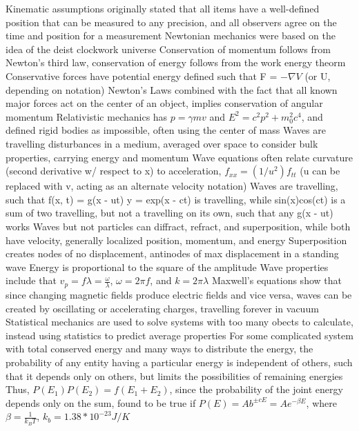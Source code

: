 \documentclass[11 pt, twoside]{article}
\newenvironment{outline*}
{
	\begin{outline}[enumerate]
	}
	{\end{outline}
}
\begin{document}
\begin{outline*}
\1 Kinematic assumptions originally stated that all items have a well-defined position that can be measured to any precision, and all observers agree on the time and position for a measurement
\1 Newtonian mechanics were based on the idea of the deist clockwork universe
	\2 Conservation of momentum follows from Newton's third law, conservation of energy follows from the work energy theorm
	\2 Conservative forces have potential energy defined such that F = $-\nabla V$ (or U, depending on notation)
	\2 Newton's Laws combined with the fact that all known major forces act on the center of an object, implies conservation of angular momentum
\1 Relativistic mechanics has $p = \gamma mv$ and $E^2 = c^2p^2 + m_0^2c^4$, and defined rigid bodies as impossible, often using the center of mass
\1 Waves are travelling disturbances in a medium, averaged over space to consider bulk properties, carrying energy and momentum
	\2 Wave equations often relate curvature (second derivative w/ respect to x) to acceleration, $f_{xx} = (1/u^2) f_{tt}$ (u can be replaced with v, acting as an alternate velocity notation)
	\2 Waves are travelling, such that f(x, t) = g(x - ut)
	\2 y = exp(x - ct) is travelling, while sin(x)cos(ct) is a sum of two travelling, but not a travelling on its own, such that any g(x - ut) works
\1 Waves but not particles can diffract, refract, and superposition, while both have velocity, generally localized position, momentum, and energy
	\2 Superposition creates nodes of no displacement, antinodes of max displacement in a standing wave
	\2 Energy is proportional to the square of the amplitude
	\2 Wave properties include that $v_p = f\lambda = \frac{\omega}{\lambda}$, $\omega = 2\pi f$, and $k = 2 \pi \lambda$
\1 Maxwell's equations show that since changing magnetic fields produce electric fields and vice versa, waves can be created by oscillating or accelerating charges, travelling forever in vacuum
\1 Statistical mechanics are used to solve systems with too many obects to calculate, instead using statistics to predict average properties
	\2 For some complicated system with total conserved energy and many ways to distribute the energy, the probability of any entity having a particular energy is independent of others, such that it depends only on others, but limits the possibilities of remaining energies
		\3 Thus, $P(E_1)P(E_2) = f(E_1 + E_2)$, since the probability of the joint energy depends only on the sum, found to be true if $P(E) = Ab^{\pm cE} = Ae^{-\beta E}$, where $\beta = \frac{1}{k_BT}$, $k_b = 1.38 * 10^{-23} J/K$

\end{outline*}
\end{document}
